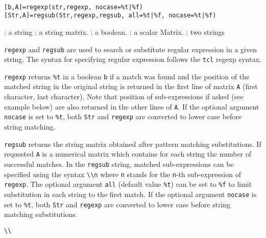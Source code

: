 
\begin{mandesc}
   \\
\end{mandesc}
\begin{calling_sequence}
\begin{verbatim}
[b,A]=regexp(str,regexp, nocase=%t|%f)
[Str,A]=regsub(Str,regexp,regsub, all=%t|%f, nocase=%t|%f)
\end{verbatim}
\end{calling_sequence}

\begin{parameters}
  \begin{varlist}
     : a string
     : a string matrix.
    :  a boolean.
    :  a scalar Matrix.
    : two strings
  \end{varlist}
\end{parameters}

\begin{mandescription}
\noindent \verb+regexp+ and \verb+regsub+ are used to search or substitute regular expression
in a given string. The syntax for specifying regular expression follows the \verb+tcl+ 
regexp syntax.

\verb+regexp+ returns \verb+%t+ in a boolean \verb+b+ if a match was found and the 
position of the matched string in the original string is returned in 
the first line of matrix \verb+A+ (first character, last character). 
Note that position of sub-expressions if asked (see example below) 
are also returned in the other lines of \verb+A+. If the optional argument \verb+nocase+ 
is set to \verb+%t+, both \verb+Str+ and \verb+regexp+ are converted to lower case before string matching.

\verb+regsub+ returns the string matrix obtained after pattern matching substitutions. 
If requested \verb+A+ is a numerical matrix which contains for each string the number of successful matches. 
In the \verb+regsub+ string, matched sub-expressions can be specified using the 
syntax \verb+\\n+ where \verb+n+ stands for the \verb+n+-th sub-expression of 
\verb+regexp+. The optional argument \verb+all+ (default value \verb+%t+) can be set to 
\verb+%f+ to limit substitution in each string to the first match. If the optional argument \verb+nocase+ 
is set to \verb+%t+, both \verb+Str+ and \verb+regexp+ are converted to lower case before string matching 
substitutions. 

\end{mandescription}

\begin{examples}
  \begin{program}
    \verb!\\! 
  \end{program}
\end{examples}


